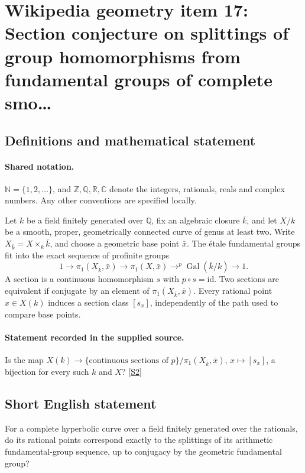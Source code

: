\documentclass[11pt]{article}
\newcommand{\sref}[2]{\hyperlink{source:#1:#2}{[S#2]}}
\begin{document}
\section{Wikipedia geometry item 17: Section conjecture on splittings of group homomorphisms from fundamental groups of complete smo…}\label{statement}

\subsection{Definitions and mathematical statement}

\paragraph{Shared notation.}$\mathbb N=\{1,2,\ldots\}$, and $\mathbb Z,\mathbb Q,\mathbb R,\mathbb C$ denote the integers, rationals, reals and complex numbers. Any other conventions are specified locally.


Let $k$ be a field finitely generated over $\mathbb Q$, fix an algebraic closure $\bar k$, and let $X/k$ be a smooth, proper, geometrically connected curve of genus at least two. Write $X_{\bar k}=X\times_k\bar k$, and choose a geometric base point $\bar x$. The étale fundamental groups fit into the exact sequence of profinite groups
\[1\longrightarrow\pi_1(X_{\bar k},\bar x)\longrightarrow\pi_1(X,\bar x)\mathrel{\mathop{\longrightarrow}^{p}}\operatorname{Gal}(\bar k/k)\longrightarrow1.\]
A section is a continuous homomorphism $s$ with $p\circ s=\mathrm{id}$. Two sections are equivalent if conjugate by an element of $\pi_1(X_{\bar k},\bar x)$. Every rational point $x\in X(k)$ induces a section class $[s_x]$, independently of the path used to compare base points.
\paragraph{Statement recorded in the supplied source.}
Is the map $X(k)\longrightarrow\{\text{continuous sections of }p\}/\pi_1(X_{\bar k},\bar x)$, $x\longmapsto[s_x]$, a bijection for every such $k$ and $X$? \sref{statement}{2}
\subsection{Short English statement}
For a complete hyperbolic curve over a field finitely generated over the rationals, do its rational points correspond exactly to the splittings of its arithmetic fundamental-group sequence, up to conjugacy by the geometric fundamental group?
\end{document}
